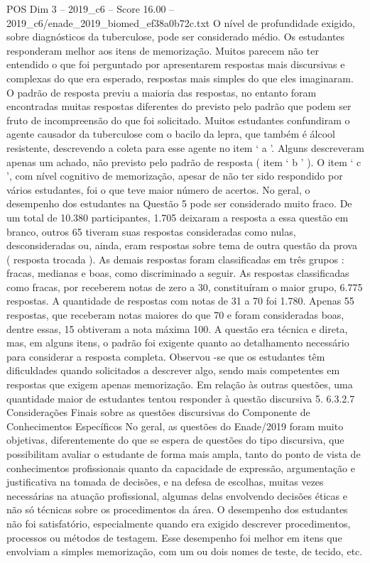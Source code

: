\begin{textsample}{POS Dim 3 – 2019\_c6 – Score 16.00 – 2019\_c6/enade\_2019\_biomed\_ef38a0b72c.txt}
O nível de profundidade exigido, sobre diagnósticos da tuberculose, pode ser considerado médio.
Os estudantes responderam melhor aos itens de memorização.
Muitos parecem não ter entendido o que foi perguntado por apresentarem respostas mais discursivas e complexas do que era esperado, respostas mais simples do que eles imaginaram.
O padrão de resposta previu a maioria das respostas, no entanto foram encontradas muitas respostas diferentes do previsto pelo padrão que podem ser fruto de incompreensão do que foi solicitado.
Muitos estudantes confundiram o agente causador da tuberculose com o bacilo da lepra, que também é álcool resistente, descrevendo a coleta para esse agente no item ‘ a ’.
Alguns descreveram apenas um achado, não previsto pelo padrão de resposta ( item ‘ b ’ ).
O item ‘ c ’, com nível cognitivo de memorização, apesar de não ter sido respondido por vários estudantes, foi o que teve maior número de acertos.
No geral, o desempenho dos estudantes na Questão 5 pode ser considerado muito fraco.
De um total de 10.380 participantes, 1.705 deixaram a resposta a essa questão em branco, outros 65 tiveram suas respostas consideradas como nulas, desconsideradas ou, ainda, eram respostas sobre tema de outra questão da prova ( resposta trocada ).
As demais respostas foram classificadas em três grupos : fracas, medianas e boas, como discriminado a seguir.
As respostas classificadas como fracas, por receberem notas de zero a 30, constituíram o maior grupo, 6.775 respostas.
A quantidade de respostas com notas de 31 a 70 foi 1.780.
Apenas 55 respostas, que receberam notas maiores do que 70 e foram consideradas boas, dentre essas, 15 obtiveram a nota máxima 100.
A questão era técnica e direta, mas, em alguns itens, o padrão foi exigente quanto ao detalhamento necessário para considerar a resposta completa.
Observou -se que os estudantes têm dificuldades quando solicitados a descrever algo, sendo mais competentes em respostas que exigem apenas memorização.
Em relação às outras questões, uma quantidade maior de estudantes tentou responder à questão discursiva 5. 6.3.2.7 Considerações Finais sobre as questões discursivas do Componente de Conhecimentos Específicos No geral, as questões do Enade/2019 foram muito objetivas, diferentemente do que se espera de questões do tipo discursiva, que possibilitam avaliar o estudante de forma mais ampla, tanto do ponto de vista de conhecimentos profissionais quanto da capacidade de expressão, argumentação e justificativa na tomada de decisões, e na defesa de escolhas, muitas vezes necessárias na atuação profissional, algumas delas envolvendo decisões éticas e não só técnicas sobre os procedimentos da área.
O desempenho dos estudantes não foi satisfatório, especialmente quando era exigido descrever procedimentos, processos ou métodos de testagem.
Esse desempenho foi melhor em itens que envolviam a simples memorização, com um ou dois nomes de teste, de tecido, etc.

\end{textsample}
